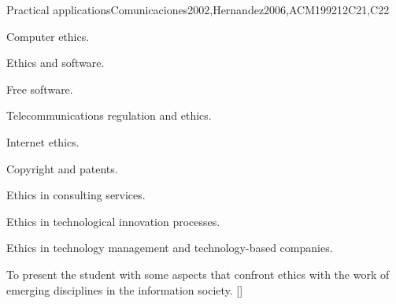 \begin{syllabus}
\begin{unit}{}{Practical applications}{Comunicaciones2002,Hernandez2006,ACM1992}{12}{C21,C22}
\begin{topics}
    \item Computer ethics.
	\begin{subtopics}
	    \item Ethics and software.
	    \item Free software.
	\end{subtopics}
    \item Telecommunications regulation and ethics.
	\begin{subtopics}
	    \item Internet ethics.
	\end{subtopics}
    \item Copyright and patents.
    \item Ethics in consulting services.
    \item Ethics in technological innovation processes.
    \item Ethics in technology management and technology-based companies.
\end{topics}
\begin{learningoutcomes}
	\item To present the student with some aspects that confront ethics with the work of emerging disciplines in the information society. [\Familiarity]
\end{learningoutcomes}
\end{unit}

\begin{coursebibliography}
\end{coursebibliography}

\end{syllabus}

